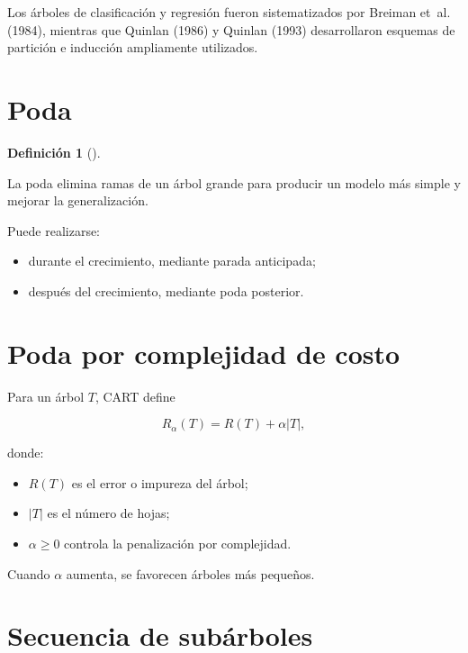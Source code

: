 \documentclass[
  spanish,
  10.5pt,
  letterpaper,
  DIV=11,
  numbers=noendperiod,
  oneside,
  open=any]{scrreprt}
\providecommand{\tightlist}{%
  \setlength{\itemsep}{0pt}\setlength{\parskip}{0pt}}
\theoremstyle{definition}
\newtheorem{definition}{Definición}[chapter]
\theoremstyle{definition}
\theoremstyle{plain}
\theoremstyle{remark}
\begin{document}
Los árboles de clasificación y regresión fueron sistematizados por
Breiman et~al. (1984), mientras que Quinlan (1986) y Quinlan (1993)
desarrollaron esquemas de partición e inducción ampliamente utilizados.

\section*{Poda}\label{poda}


\begin{definition}[]\protect\hypertarget{def-poda}{}\label{def-poda}

La poda elimina ramas de un árbol grande para producir un modelo más
simple y mejorar la generalización.

\end{definition}

Puede realizarse:

\begin{itemize}
\tightlist
\item
  durante el crecimiento, mediante parada anticipada;
\item
  después del crecimiento, mediante poda posterior.
\end{itemize}

\section*{Poda por complejidad de
costo}\label{poda-por-complejidad-de-costo}


Para un árbol \(T\), CART define

\[
R_\alpha(T)
=
R(T)+\alpha |T|,
\]

donde:

\begin{itemize}
\tightlist
\item
  \(R(T)\) es el error o impureza del árbol;
\item
  \(|T|\) es el número de hojas;
\item
  \(\alpha\geq 0\) controla la penalización por complejidad.
\end{itemize}

Cuando \(\alpha\) aumenta, se favorecen árboles más pequeños.

\section*{Secuencia de subárboles}\label{secuencia-de-subuxe1rboles}
\end{document}
